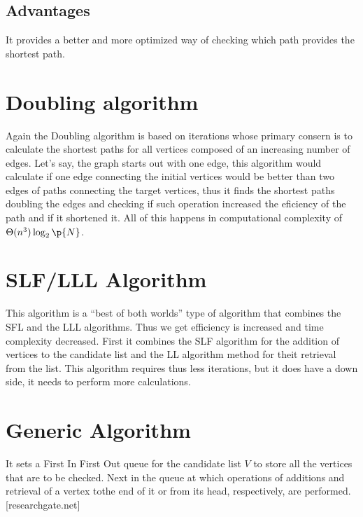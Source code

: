 \documentclass{article}
\begin{document}
\subsection{Advantages}
It provides a better and more optimized way of checking which path provides the shortest path.

\section{Doubling algorithm} 
Again the Doubling algorithm is based on iterations whose primary consern is to calculate the shortest paths for all vertices composed of an increasing number of edges. Let's say, the graph starts out with one edge, this algorithm would calculate if one edge connecting the initial vertices would be better than two edges of paths connecting the target vertices, thus it finds the shortest paths doubling the edges and checking if such operation increased the eficiency of the path and if it shortened it. All of this happens in computational complexity of $\Theta (n^3)\log_{2}\p{ N } $.

\section{SLF/LLL Algorithm}
This algorithm is a ``best of both worlds'' type of algorithm that combines the SFL and the LLL algorithms. Thus we get efficiency is increased and time complexity decreased. First it combines the SLF algorithm for the addition of vertices to the candidate list and the LL algorithm method for theit retrieval from the list. This algorithm requires thus less iterations, but it does have a down side, it needs to perform more calculations.

\section{Generic Algorithm}
It sets a First In First Out queue for the candidate list $V$ to store all the vertices that are to be checked. Next in the queue at which operations of additions and retrieval of a vertex tothe end of it or from its head, respectively, are performed. [researchgate.net]  


\end{document}
